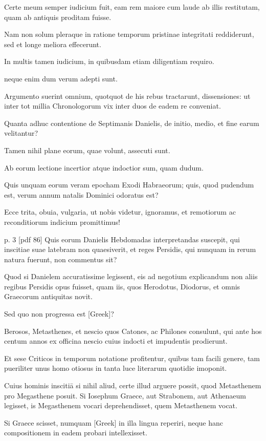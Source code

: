 Certe meum semper iudicium fuit, eam rem maiore
cum laude ab illis restitutam, quam ab antiquis proditam fuisse.

Nam
non solum pleraque in ratione temporum pristinae integritati reddiderunt,
sed et longe meliora effecerunt.

In multis tamen iudicium, in quibusdam
etiam diligentiam requiro.

neque enim dum verum adepti sunt.

Argumento suerint omnium, quotquot de his rebus tractarunt, dissensiones:
ut inter tot millia Chronologorum vix inter duos de eadem re
conveniat.

Quanta adhuc contentione de Septimanis Danielis, de initio,
medio, et fine earum velitantur?

Tamen nihil plane eorum, quae volunt,
assecuti sunt.

Ab eorum lectione incertior atque indoctior sum,
quam dudum.

Quis unquam eorum veram epocham Exodi Habraeorum;
quis, quod pudendum est, verum annum natalis Dominici odoratus
est?

Ecce trita, obuia, vulgaria, ut nobis videtur, ignoramus, et remotiorum
ac reconditiorum indicium promittimus!

p. 3 [pdf 86]
%
Quis eorum Danielis
Hebdomadas interpretandas suscepit, qui inscitiae suae latebram
non quaesiverit, et reges Persidis, qui nunquam in rerum natura fuerunt,
non commentus sit?

Quod si Danielem accuratissime legissent,
eis ad negotium explicandum non aliis regibus Persidis opus fuisset,
quam iis, quos Herodotus, Diodorus, et omnis Graecorum antiquitas
novit.

Sed quo non progressa est \textgreek{[Greek]}?

Berosos, Metasthenes, et
nescio quos Catones, ac Philones consulunt, qui ante hos centum annos
ex officina nescio cuius indocti et impudentis prodierunt.

Et sese
Criticos in temporum notatione profitentur, quibus tam facili genere,
tam pueriliter unus homo otiosus in tanta luce literarum quotidie imoponit.


Cuius hominis inscitiā si nihil aliud, certe illud arguere possit, quod
Metasthenem pro Megasthene posuit. Si Iosephum Graece, aut Strabonem,
aut Athenaeum legisset, is Megasthenem vocari deprehendisset,
quem Metasthenem vocat.

Si Graece scisset, numquam \textgreek{[Greek]} in illa
lingua reperiri, neque hanc compositionem in eadem probari intellexisset.

